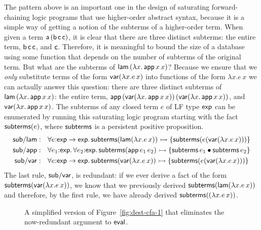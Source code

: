 The pattern above is an important one in the design of saturating
forward-chaining logic programs that use higher-order abstract syntax,
because it is a simple way of getting a notion of the subterms of a
higher-order term. When given a term ${\sf a}\,({\sf b}\,{\sf c}\,{\sf
  c})$, it is clear that there are three distinct subterms: the entire
term, ${\sf b}\,{\sf c}\,{\sf c}$, and ${\sf c}$. Therefore, it is
meaningful to bound the size of a database using some function that
depends on the number of subterms of the original term. But what are
the subterms of ${\sf lam}\,(\lambda x.\,{\sf app}\,x\,x)$?  Because
we ensure that we {\it only} substitute terms of the form ${\sf
  var}(\lambda x.e\,x)$ into functions of the form $\lambda x.e\,x$ we
can actaully answer this question: there are three distinct subterms
of ${\sf lam}\,(\lambda x.\,{\sf app}\,x\,x)$: the entire term, ${\sf
  app}\,({\sf var}(\lambda x.\,{\sf app}\,x\,x))\,({\sf var}(\lambda
x.\,{\sf app}\,x\,x))$, and ${\sf var}(\lambda x.\,{\sf app}\,x\,x)$.
The subterms of any closed term $e$ of LF type ${\sf exp}$ can be enumerated
by running this saturating logic program starting with the fact 
${\sf subterms}(e)$, where ${\sf subterms}$ is a persistent positive 
proposition.
\begin{align*}
{\sf sub/lam} &: ~~
  \forall e{:}{\sf exp} \rightarrow {\sf exp}.\,
    {\sf subterms}({\sf lam}(\lambda x.e\,x)) \rightarrowtail
      \{ {\sf subterms}(e({\sf var}(\lambda x.e\,x))) \}
\\
{\sf sub/app} &: ~~
  \forall e_1{:}{\sf exp}.\, \forall e_2{:}{\sf exp}.\,
    {\sf subterms}({\sf app}\,e_1\,e_2) \rightarrowtail
      \{ {\sf subterms}\,e_1 \mathbin{\bullet} {\sf subterms}\,e_2 \}
\\
{\sf sub/var} &: ~~ 
  \forall e{:}{\sf exp} \rightarrow {\sf exp}.\,
    {\sf subterms}({\sf var}(\lambda x.e\,x)) \rightarrowtail
      \{ {\sf subterms}(e({\sf var}(\lambda x.e\,x))) \}
\end{align*}
The last rule, ${\sf sub/var}$, is redundant: if we ever derive a fact
of the form ${\sf subterms}({\sf var}(\lambda x.e\,x))$, we know that
we previously derived ${\sf subterms}({\sf lam}(\lambda x.e\,x))$ and
therefore, by the first rule, we have already derived ${\sf
  subterms}({\sf }(\lambda x.e\,x))$.

\begin{figure}
\caption{A simplified version of Figure~\ref{fig:dest-cfa-1} that
  eliminates the now-redundant argument to ${\sf eval}$.}
\label{fig:dest-cfa-2}
\end{figure}


